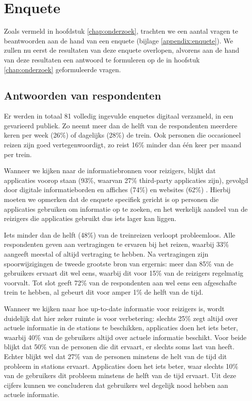 \section{Enquete}
Zoals vermeld in hoofdstuk \ref{chap:onderzoek}, trachten we een aantal vragen te beantwoorden aan de hand van een enquete (bijlage \ref{appendix:enquete}). We zullen nu eerst de resultaten van deze enquete overlopen, alvorens aan de hand van deze resultaten een antwoord te formuleren op de in hoofstuk \ref{chap:onderzoek} geformuleerde vragen.

\subsection{Antwoorden van respondenten}
Er werden in totaal 81 volledig ingevulde enquetes digitaal verzameld, in een gevarieerd publiek. Zo neemt meer dan de helft van de respondenten meerdere keren per week (26\%) of dagelijks (28\%) de trein. Ook personen die occasioneel reizen zijn goed vertegenwoordigt, zo reist 16\% minder dan één keer per maand per trein.

Wanneer we kijken naar de informatiebronnen voor reizigers, blijkt dat  applicaties voorop staan (93\%, waarvan 27\% third-party applicaties zijn), gevolgd door digitale informatieborden en affiches (74\%) en websites (62\%) . Hierbij moeten we opmerken dat de enquete specifiek gericht is op personen die applicaties gebruiken om informatie op te zoeken, en het werkelijk aandeel van de reizigers die applicaties gebruikt dus iets lager kan liggen.

Iets minder dan de helft (48\%) van de treinreizen verloopt probleemloos. Alle respondenten geven aan vertragingen te ervaren bij het reizen, waarbij 33\% aangeeft meestal of altijd vertraging te hebben. Na vertragingen zijn spoorwijzigingen de tweede grootste bron van ergernis: meer dan 85\% van de gebruikers ervaart dit wel eens, waarbij dit voor 15\% van de reizigers regelmatig voorvalt. Tot slot geeft 72\% van de respondenten aan wel eens een afgeschafte trein te hebben, al gebeurt dit voor amper 1\% de helft van de tijd.

Wanneer we kijken naar hoe up-to-date informatie voor reizigers is, wordt duidelijk dat hier zeker ruimte is voor verbetering: slechts 25\% zegt altijd over actuele informatie in de stations te beschikken, applicaties doen het iets beter, waarbij 40\% van de gebruikers altijd over actuele informatie beschikt. Voor beide blijkt dat 50\% van de personen die dit ervaart, er slechts soms last van heeft. Echter blijkt wel dat 27\% van de personen minstens de helt van de tijd dit probleem in stations ervaart. Applicaties doen het iets beter, waar slechts 10\% van de gebruikers dit probleem minstens de helft van de tijd ervaart. Uit deze cijfers kunnen we concluderen dat gebruikers wel degelijk nood hebben aan actuele informatie. 

